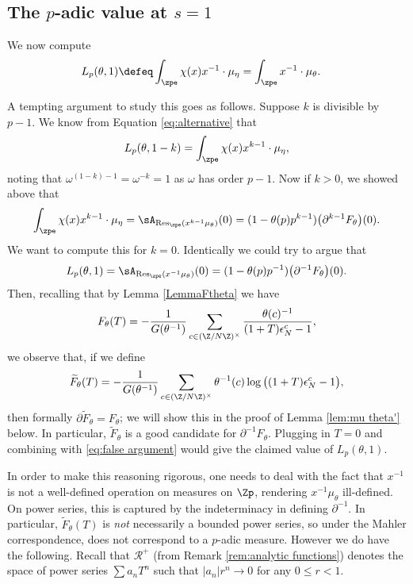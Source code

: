 \documentclass[a4paper,10pt, english, reqno]{smfart}
\numberwithin{equation}{section}
\begin{document}
\subsection{The $p$-adic value at $s = 1$}\label{sec:p-adic s=1}

We now compute
\begin{align} \label{EqLp1} L_p(\theta, 1) &\defeq \int_{\zpe} \chi(x) x^{-1} \cdot \mu_\eta = \int_{\zpe} x^{-1} \cdot \mu_\theta.
\end{align} 

A tempting argument to study this goes as follows. Suppose $k$ is divisible by $p-1$. We know from Equation \eqref{eq:alternative} that 
\[
L_p(\theta,1-k) = \int_{\zpe}\chi(x)x^{k-1}\cdot \mu_\eta,
\]
noting that $\omega^{(1-k)-1} = \omega^{-k} = 1$ as $\omega$ has order $p-1$. Now if $k>0$, we showed above that
\[
\int_{\zpe}\chi(x)x^{k-1} \cdot \mu_\eta = \sA_{\mathrm{Res}_{\zpe}(x^{k-1}\mu_\theta)}(0) = (1-\theta(p)  p^{k-1})\big(\partial^{k-1}F_\theta\big)(0).
\]
We want to compute this for $k=0$. Identically we could try to argue that
\begin{equation}\label{eq:false argument}
L_p(\theta, 1) = \sA_{\mathrm{Res}_{\zpe}(x^{-1}\mu_\theta)}(0)= (1-\theta(p)p^{-1})\big(\partial^{-1} F_\theta\big)(0).
\end{equation}
Then, recalling that by Lemma \ref{LemmaFtheta} we have
\[ F_\theta(T) = -\frac{1}{G(\theta^{-1})} \sum_{c\in(\Z/N\Z)^\times}\frac{\theta(c)^{-1}}{(1+T)\epsilon_{N}^c - 1}, \]
we observe that, if we define  
\[
\widetilde{F}_\theta(T) = - \frac{1}{G(\theta^{-1})} \sum_{c \in (\Z / N \Z)^\times} \theta^{-1}(c) \log \big( (1 + T) \epsilon_N^c - 1 \big),
\]
then formally $\partial \widetilde{F}_\theta = F_\theta$; we will show this in the proof of Lemma \ref{lem:mu theta'} below. In particular, $\widetilde{F}_\theta$ is a good candidate for $\partial^{-1}F_\theta$. Plugging in $T=0$ and combining with \eqref{eq:false argument} would give the claimed value of $L_p(\theta,1)$. 

In order to make this reasoning rigorous, one needs to deal with the fact that $x^{-1}$ is not a well-defined operation on measures on $\Zp$, rendering $x^{-1}\mu_\theta$ ill-defined. On power series, this is captured by the indeterminacy in defining $\partial^{-1}$. In particular, $\widetilde{F}_\theta(T)$ is \emph{not} necessarily a bounded power series, so under the Mahler correspondence, does not correspond to a $p$-adic measure. However we do have the following. Recall that $\mathscr{R}^+$ (from Remark \ref{rem:analytic functions}) denotes the space of power series $\sum a_nT^n$ such that $|a_n|r^n \to 0$ for any $0\leq r <1$.
\end{document}

